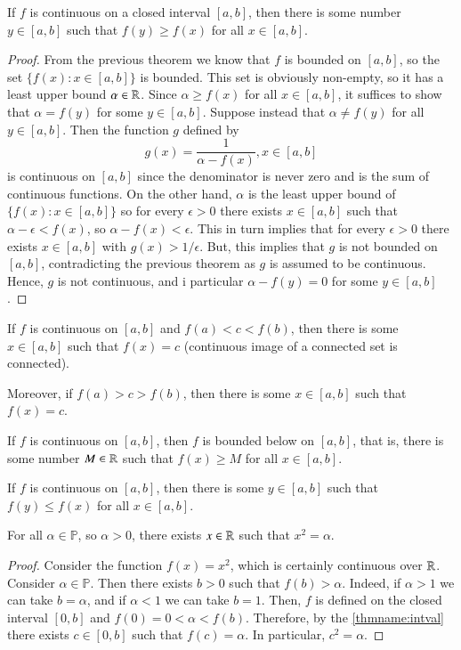 \begin{thm}
    If $f$ is continuous on a closed interval $[a,b]$, then there is some number $y \in [a,b]$ such that $f(y) \geq f(x)$ for all $x \in [a,b]$.
\end{thm}
\begin{proof}
    From the previous theorem we know that $f$ is bounded on $[a,b]$, so the set $\{f(x):x\in[a,b]\}$ is bounded. This set is obviously non-empty, so it has a least upper bound $\alpha \in \mathbb R$. Since $\alpha \geq f(x)$ for all $x \in [a,b]$, it suffices to show that $\alpha = f(y)$ for some $y \in [a,b]$. Suppose instead that $\alpha \neq f(y)$ for all $y \in [a,b]$. Then the function $g$ defined by $$g(x) = \frac{1}{\alpha - f(x)}, x \in [a,b]$$ is continuous on $[a,b]$ since the denominator is never zero and is the sum of continuous functions. On the other hand, $\alpha$ is the least upper bound of $\{f(x):x\in [a,b]\}$ so for every $\epsilon > 0$ there exists $x \in [a,b]$ such that $\alpha - \epsilon < f(x)$, so $\alpha - f(x) < \epsilon$. This in turn implies that for every $\epsilon > 0$ there exists $x \in [a,b]$ with $g(x) > 1/\epsilon$. But, this implies that $g$ is not bounded on $[a,b]$, contradicting the previous theorem as $g$ is assumed to be continuous. Hence, $g$ is not continuous, and i particular $\alpha - f(y) = 0$ for some $y \in [a,b]$.
\end{proof}


\begin{namthm}\label{thmname:intval}
    If $f$ is continuous on $[a,b]$ and $f(a) < c < f(b)$, then there is some $x \in [a,b]$ such that $f(x) = c$ (continuous image of a connected set is connected).

    Moreover, if $f(a) > c > f(b)$, then there is some $x \in [a,b]$ such that $f(x) = c$.
\end{namthm}

\begin{thm}
    If $f$ is continuous on $[a,b]$, then $f$ is bounded below on $[a,b]$, that is, there is some number $M \in \mathbb R$ such that $f(x) \geq M$ for all $x \in [a,b]$.
\end{thm}

\begin{thm}
    If $f$ is continuous on $[a,b]$, then there is some $y \in [a,b]$ such that $f(y) \leq f(x)$ for all $x \in [a,b]$.
\end{thm}


\begin{cor}
    For all $\alpha \in \mathbb{P}$, so $\alpha >0$, there exists $x \in \mathbb R$ such that $x^2 = \alpha$.
\end{cor}
\begin{proof}
    Consider the function $f(x) = x^2$, which is certainly continuous over $\mathbb R$. Consider $\alpha \in \mathbb{P}$. Then there exists $b > 0$ such that $f(b) > \alpha$. Indeed, if $\alpha > 1$ we can take $b = \alpha$, and if $\alpha < 1$ we can take $b = 1$. Then, $f$ is defined on the closed interval $[0,b]$ and $f(0) = 0 < \alpha < f(b)$. Therefore, by the \ref{thmname:intval} there exists $c \in [0,b]$ such that $f(c) = \alpha$. In particular, $c^2 = \alpha$.
\end{proof}



